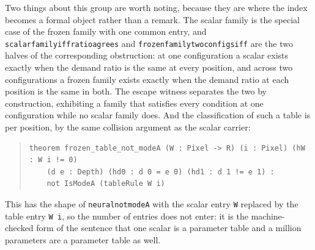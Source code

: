 Two things about this group are worth noting, because they are where the index becomes a formal object rather than a remark. The scalar family is the special case of the frozen family with one common entry, and \texttt{scalar\ttu family\ttu iff\ttu ratio\ttu agrees} and \texttt{frozen\ttu family\ttu two\ttu configs\ttu iff} are the two halves of the corresponding obstruction: at one configuration a scalar exists exactly when the demand ratio is the same at every position, and across two configurations a frozen family exists exactly when the demand ratio at each position is the same in both. The escape witness separates the two by construction, exhibiting a family that satisfies every condition at one configuration while no scalar family does. And the classification of such a table is per position, by the same collision argument as the scalar carrier:
\begin{quote}
\small
\begin{verbatim}
theorem frozen_table_not_modeA (W : Pixel -> R) (i : Pixel) (hW : W i != 0)
    (d e : Depth) (hd0 : d 0 = e 0) (hd1 : d 1 != e 1) :
    not IsModeA (tableRule W i)
\end{verbatim}
\end{quote}
\noindent This has the shape of \texttt{neural\ttu not\ttu modeA} with the scalar entry \texttt{W} replaced by the table entry \texttt{W i}, so the number of entries does not enter: it is the machine-checked form of the sentence that one scalar is a parameter table and a million parameters are a parameter table as well.

